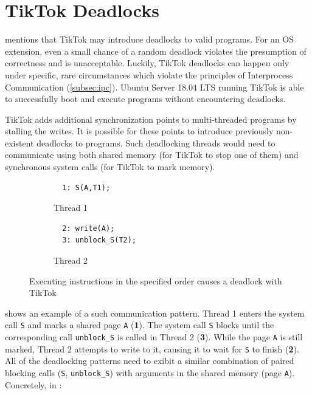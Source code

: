 \section{TikTok Deadlocks}
\label{sec:deadlocks}

 mentions that TikTok may introduce deadlocks to valid
programs. For an OS extension, even a small chance of a random deadlock violates
the presumption of correctness and is unacceptable. Luckily, TikTok deadlocks
can happen only under specific, rare circumstances which violate the principles
of Interprocess Communication (\cref{subsec:ipc}). Ubuntu Server 18.04 LTS
running TikTok is able to successfully boot and execute programs without
encountering deadlocks.


TikTok adds additional synchronization points to multi-threaded programs by
stalling the writes. It is possible for these points to introduce previously
non-existent deadlocks to programs. Such deadlocking threads would need to
communicate using both shared memory (for TikTok to stop one of them) and
synchronous system calls (for TikTok to mark memory).

\begin{figure}
  \centering
  \begin{subfigure}[b]{0.45\linewidth}
  \begin{minipage}{\linewidth}
  \begin{lstlisting}
  1: S(A,T1);  
  \end{lstlisting}
  \end{minipage}
  \caption{Thread 1}
  \end{subfigure}
  \hfill
  \begin{subfigure}[b]{0.45\linewidth}
  \begin{minipage}{\linewidth}
  \begin{lstlisting}
  2: write(A);
  3: unblock_S(T2);
  \end{lstlisting}  
  \end{minipage}
  \caption{Thread 2}
  \end{subfigure}
  \caption{Executing instructions in the specified order causes a deadlock with TikTok}
  \label{fig:deadlock}
\end{figure}


 shows an example of a such communication pattern. Thread 1
enters the system call \texttt{S} and marks a shared page \texttt{A} (\textbf{1}). The
system call \texttt{S} blocks until the corresponding call \texttt{unblock\_S} is called
in Thread 2 (\textbf{3}). While the page \texttt{A} is still marked, Thread 2
attempts to write to it, causing it to wait for \texttt{S} to finish
(\textbf{2}). All of the deadlocking patterns need to exibit a similar combination
of paired blocking calls (\texttt{S}, \texttt{unblock\_S}) with arguments in the shared
memory (page \texttt{A}). Concretely, in :

